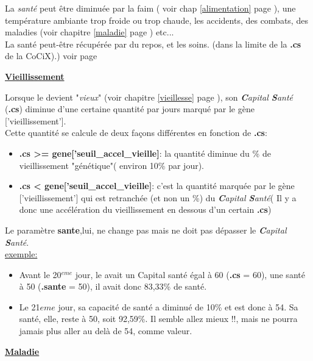 \documentclass[french]{report}
\begin{document}

La \textit{santé} peut être diminuée par la faim ( voir chap \ref{alimentation} page \pageref{alimentation}), une température ambiante trop froide ou trop chaude, les accidents, des combats, des maladies (voir chapitre \ref{maladie} page \pageref{maladie}) etc...\\

La santé peut-être récupérée par du repos, et les soins. (dans la limite de la \textbf{.cs} de la CoCiX).) voir page \pageref{repos}\\

\begin{center}
\underline{\textbf{Vieillissement}}\label{vieillissement}
\end{center}
Lorsque le \CoCiX devient "\textit{vieux}" (voir chapitre \ref{vieillesse} page \pageref{vieillesse}), son \textit{\textbf{C}apital \textbf{S}anté} (\textbf{.cs}) diminue d'une certaine quantité par jours marqué par le gène ['vieillissement'].\\
Cette quantité se calcule de deux façons différentes en fonction de \textbf{.cs}:
\begin{itemize}
	\item \textbf{.cs >= gene['seuil\_accel\_vieille]}: la quantité diminue du \% de vieillissement "génétique"( environ 10\% par jour).
	\item \textbf{.cs <  gene['seuil\_accel\_vieille]}: c'est la quantité marquée par le gène ['vieillissement'] qui est retranchée (et non un \%) du \textit{\textbf{C}apital \textbf{S}anté}( Il y a donc une accélération du vieillissement en dessous d'un certain \textbf{.cs})\\
\end{itemize}

Le paramètre \textbf{sante},lui, ne change pas mais ne doit pas dépasser le \textit{\textbf{C}apital \textbf{S}anté}.\\

\underline{exemple:}\\
\begin{itemize}
\item Avant le 20$^{eme}$ jour, le \CoCiX avait un Capital santé égal à  60 (\textbf{.cs} = 60), une santé à 50 (\textbf{.sante} = 50), il avait donc 83,33\% de santé.\\

\item Le 21${eme}$ jour, sa capacité de santé a diminué de 10\% et est donc à 54. Sa santé, elle, reste à 50, soit 92,59\%. Il semble allez mieux !!, mais ne pourra jamais plus aller au delà de 54, comme valeur.\\
\end{itemize}
\begin{center}
\underline{\textbf{Maladie}}\label{maladie}
\end{center}
\end{document}

